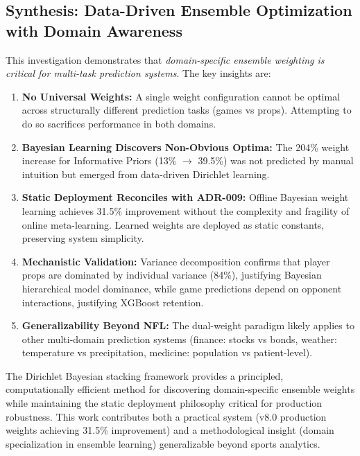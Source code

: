 \subsection{Synthesis: Data-Driven Ensemble Optimization with Domain Awareness}
\label{subsec:dirichlet-synthesis}

This investigation demonstrates that \emph{domain-specific ensemble weighting is critical for multi-task prediction systems}. The key insights are:

\begin{enumerate}
\item \textbf{No Universal Weights:} A single weight configuration cannot be optimal across structurally different prediction tasks (games vs props). Attempting to do so sacrifices performance in both domains.

\item \textbf{Bayesian Learning Discovers Non-Obvious Optima:} The 204\% weight increase for Informative Priors (13\% $\to$ 39.5\%) was not predicted by manual intuition but emerged from data-driven Dirichlet learning.

\item \textbf{Static Deployment Reconciles with ADR-009:} Offline Bayesian weight learning achieves 31.5\% improvement without the complexity and fragility of online meta-learning. Learned weights are deployed as static constants, preserving system simplicity.

\item \textbf{Mechanistic Validation:} Variance decomposition confirms that player props are dominated by individual variance (84\%), justifying Bayesian hierarchical model dominance, while game predictions depend on opponent interactions, justifying XGBoost retention.

\item \textbf{Generalizability Beyond NFL:} The dual-weight paradigm likely applies to other multi-domain prediction systems (finance: stocks vs bonds, weather: temperature vs precipitation, medicine: population vs patient-level).
\end{enumerate}

The Dirichlet Bayesian stacking framework provides a principled, computationally efficient method for discovering domain-specific ensemble weights while maintaining the static deployment philosophy critical for production robustness. This work contributes both a practical system (v8.0 production weights achieving 31.5\% improvement) and a methodological insight (domain specialization in ensemble learning) generalizable beyond sports analytics.
